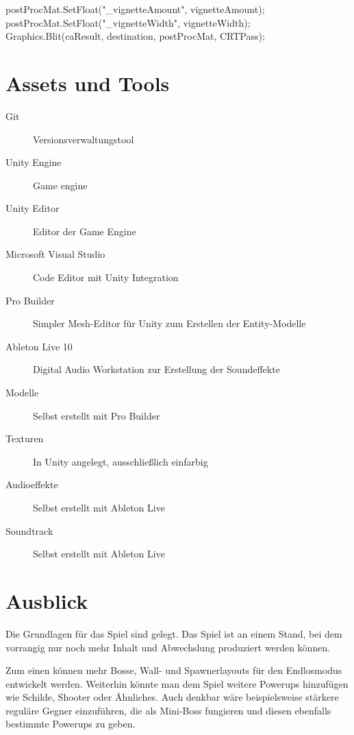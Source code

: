 \documentclass[a4paper,ngerman,12pt]{report}
\begin{document}
\begin{csh}[caption=Shader Uniform and Dispatch]
postProcMat.SetFloat("_vignetteAmount", vignetteAmount);
postProcMat.SetFloat("_vignetteWidth", vignetteWidth);
Graphics.Blit(caResult, destination, postProcMat, CRTPass);
\end{csh}









\chapter{Assets und Tools}

\begin{description}
\item[Git] Versionsverwaltungstool
\item[Unity Engine] Game engine
\item[Unity Editor] Editor der Game Engine
\item[Microsoft Visual Studio] Code Editor mit Unity Integration
\item[Pro Builder] Simpler Mesh-Editor für Unity zum Erstellen der Entity-Modelle
\item[Ableton Live 10] Digital Audio Workstation zur Erstellung der Soundeffekte
\vspace{5mm}
\item[Modelle] Selbst erstellt mit Pro Builder
\item[Texturen] In Unity angelegt, ausschlie{\ss}lich einfarbig
\item[Audioeffekte] Selbst erstellt mit Ableton Live
\item[Soundtrack] Selbst erstellt mit Ableton Live

\end{description}






\chapter{Ausblick}

Die Grundlagen für das Spiel sind gelegt. Das Spiel ist an einem Stand, bei dem vorrangig nur noch mehr Inhalt und Abwechslung produziert werden können.

Zum einen können mehr Bosse, Wall- und Spawnerlayouts für den Endlosmodus entwickelt werden. Weiterhin könnte man dem Spiel weitere Powerups hinzufügen wie Schilde, Shooter oder Ähnliches. Auch denkbar wäre beispielsweise stärkere reguläre Gegner einzuführen, die als Mini-Boss fungieren und diesen ebenfalls bestimmte Powerups zu geben.
\end{document}
